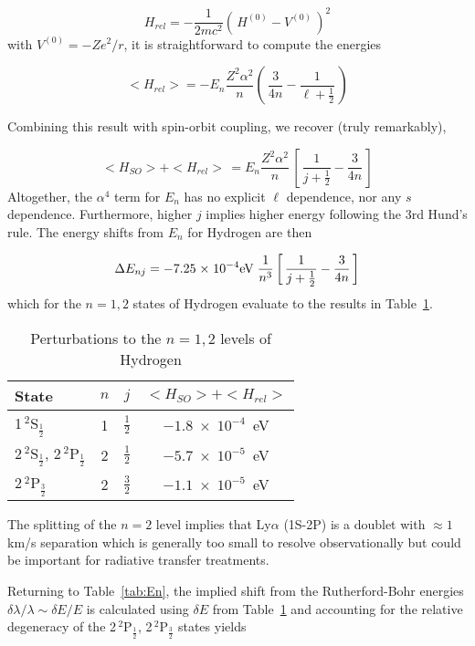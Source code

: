 \documentclass[graybox]{svmult}
\def\ohf{\frac{1}{2}}
\def\ltk{\left [ \,}
\def\ltp{\left ( \,}
\def\rtk{\, \right  ] }
\def\rtp{\, \right  ) }
\def\sci#1{{\; \times \; 10^{#1}}}
\def\rhf{\frac{3}{2}}
\begin{document}
\begin{equation*}
H_{rel} = -\frac{1}{2mc^2} \ltp H^{(0)} - V^{(0)} \rtp^2
\end{equation*}
with $V^{(0)} = -Z e^2/r$, it is straightforward to
compute the energies

\begin{equation}
<H_{rel}> = -E_n \frac{Z^2 \alpha^2}{n} \ltp \frac{3}{4n} - \frac{1}{\ell + \ohf} \rtp
\end{equation}

Combining this result with spin-orbit coupling,
we recover (truly remarkably), 

\begin{equation}
<H_{SO}> + <H_{rel}> \, = E_n \frac{Z^2 \alpha^2}{n} \, 
\ltk \frac{1}{j+\ohf} - \frac{3}{4n} \rtk
\end{equation}
Altogether, the $\alpha^4$ term for $E_n$ has
no explicit $\ell$ dependence, nor any $s$ dependence.
Furthermore, higher $j$ implies higher energy 
following the 3rd Hund's rule.
The energy shifts from $E_n$ for Hydrogen are then

\begin{equation}
\Delta E_{nj} = -7.25 \sci{-4} {\rm eV} \; \frac{1}{n^3} 
   \ltk \frac{1}{j+\ohf} - \frac{3}{4n} \rtk
\end{equation}
which for the $n=1,2$ states of Hydrogen evaluate to
the results in Table~\ref{tab:Enshift}.

\begin{table}
\label{tab:Enshift}
\caption{Perturbations to the $n=1,2$ levels of Hydrogen}
\begin{center}
\begin{tabular}{lccc}
\hline
State & $n$ & $j$ & $<H_{SO}> + <H_{rel}>$ \\
\hline
1\,$^2$S$_{\ohf}$ & 1 & $\ohf$ & $-1.8 \sci{-4}$~eV \\
2\,$^2$S$_{\ohf}$, 2\,$^2$P$_\ohf$ & 2 & $\ohf$ & $-5.7 \sci{-5}$~eV \\
2\,$^2$P$_\rhf$ & 2 & $\rhf$ & $-1.1 \sci{-5}$~eV \\
\hline
\end{tabular}
\end{center}
\end{table}

The splitting of the $n=2$ level implies that
Ly$\alpha$ (1S-2P) is a doublet with $\approx 1$km/s separation
which is generally too small to resolve observationally
but could be important for radiative transfer treatments.

Returning to Table~\ref{tab:En}, the implied
shift from the Rutherford-Bohr energies
$\delta\lambda/\lambda \sim \delta E/E$
is calculated using $\delta E$ from Table~\ref{tab:Enshift}
and accounting for the relative degeneracy of the 
2\,$^2$P$_\ohf$, 2\,$^2$P$_\rhf$ states
yields
\end{document}
